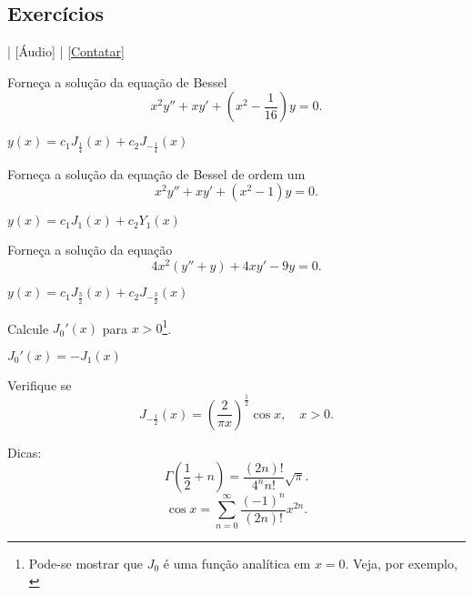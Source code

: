   \subsection*{Exercícios}

    \begin{flushright}
    [Vídeo] | [Áudio] | \href{https://phkonzen.github.io/notas/contato.html}{[Contatar]}
  \end{flushright}

  \begin{exer}
    Forneça a solução da equação de Bessel
    \begin{equation}
      x^2y'' + xy' + (x^2-\frac{1}{16})y = 0.
    \end{equation}
  \end{exer}
  \begin{resp}
    $y(x) = c_1J_{\frac{1}{4}}(x) + c_2J_{-\frac{1}{4}}(x)$
  \end{resp}


  \begin{exer}
    Forneça a solução da equação de Bessel de ordem um
    \begin{equation}
      x^2y'' + xy' + (x^2-1)y = 0.
    \end{equation}
  \end{exer}
  \begin{resp}
    $y(x) = c_1J_1(x) + c_2Y_1(x)$
  \end{resp}

  \begin{exer}
    Forneça a solução da equação
    \begin{equation}
      4x^2(y''+y) + 4xy' -9y = 0.
    \end{equation}
  \end{exer}
  \begin{resp}
    $y(x) = c_1J_{\frac{3}{2}}(x) + c_2J_{-\frac{3}{2}}(x)$
  \end{resp}

  \begin{exer}
    Calcule $J_0'(x)$ para $x>0$\footnote{Pode-se mostrar que $J_0$ é uma função analítica em $x=0$. Veja, por exemplo, \cite[Capítulo 5., Seção 5.7.]{Boyce2020}}.
  \end{exer}
  \begin{resp}
    $J_0'(x)=-J_1(x)$
  \end{resp}

  \begin{exer}
    Verifique se
    \begin{equation}
      J_{-\frac{1}{2}}(x) = \left(\frac{2}{\pi x}\right)^{\frac{1}{2}}\cos x,\quad x>0.
    \end{equation}
  \end{exer}
  \begin{resp}
    Dicas:
    \begin{equation}
      \Gamma\left(\frac{1}{2}+n\right) = \frac{(2n)!}{4^nn!}\sqrt{\pi}.
    \end{equation}
    \begin{equation}
      \cos x = \sum_{n=0}^\infty \frac{(-1)^n}{(2n)!}x^{2n}.
    \end{equation}  
  \end{resp}

